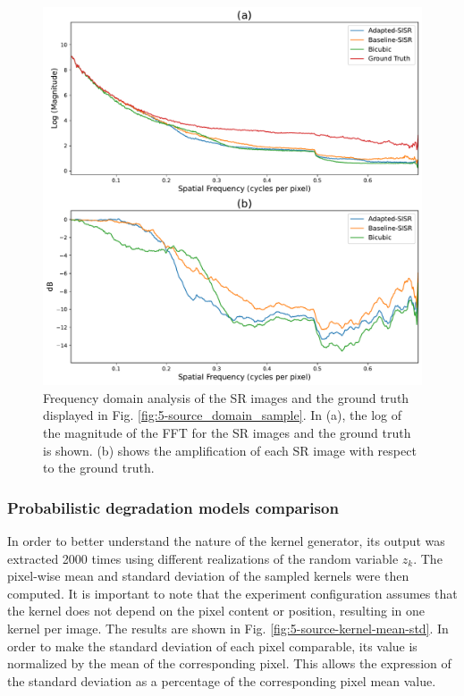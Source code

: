         \begin{figure}[H]
            \centering
            \includegraphics[scale=0.5]{Includes/5-source-sr-fft-comparison.pdf}
            \caption{Frequency domain analysis of the SR images and the ground truth displayed in Fig. \ref{fig:5-source_domain_sample}.
                     In (a), the log of the magnitude of the FFT for the SR images and the ground truth is shown.
                     (b) shows the amplification of each SR image with respect to the ground truth.}
            \label{fig:5-source-sr-fft-comparison}
        \end{figure}

        \subsubsection{Probabilistic degradation models comparison}

        In order to better understand the nature of the kernel generator, its output was extracted 2000 times using different realizations of the random variable $z_k$.
        The pixel-wise mean and standard deviation of the sampled kernels were then computed.
        It is important to note that the experiment configuration assumes that the kernel does not depend on the pixel content or position, resulting in one kernel per image.
        The results are shown in Fig. \ref{fig:5-source-kernel-mean-std}. 
        In order to make the standard deviation of each pixel comparable, its value is normalized by the mean of the corresponding pixel. 
        This allows the expression of the standard deviation as a percentage of the corresponding pixel mean value.
        
